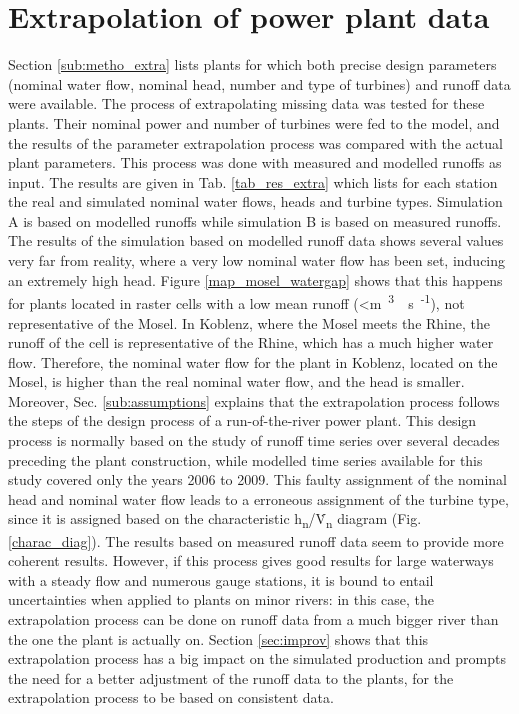 \section{Extrapolation of power plant data}
\label{sec:missing_data}
Section \ref{sub:metho_extra} lists plants for which both precise design parameters (nominal water flow, nominal head, number and type of turbines) and runoff data were available. The process of extrapolating missing data was tested for these plants. Their nominal power and number of turbines were fed to the model, and the results of the parameter extrapolation process was compared with the actual plant parameters. This process was done with measured and modelled runoffs as input. The results are given in Tab. \ref{tab_res_extra} which lists for each station the real and simulated nominal water flows, heads and turbine types. Simulation A is based on modelled runoffs while simulation B is based on measured runoffs. \newline
The results of the simulation based on modelled runoff data shows several values very far from reality, where a very low nominal water flow has been set, inducing an extremely high head. Figure \ref{map_mosel_watergap} shows that this happens for plants located in raster cells with a low mean runoff (<\unit[10]{m\textsuperscript{3}\textperiodcentered s\textsuperscript{-1}}), not representative of the Mosel. In Koblenz, where the Mosel meets the Rhine, the runoff of the cell is representative of the Rhine, which has a much higher water flow. Therefore, the nominal water flow for the plant in Koblenz, located on the Mosel, is higher than the real nominal water flow, and the head is smaller. Moreover, Sec. \ref{sub:assumptions} explains that the extrapolation process follows the steps of the design process of a run-of-the-river power plant. This design process is normally based on the study of runoff time series over several decades preceding the plant construction, while modelled time series available for this study covered only the years 2006 to 2009. \newline
This faulty assignment of the nominal head and nominal water flow leads to a erroneous assignment of the turbine type, since it is assigned based on the characteristic h\textsubscript{n}/\.V\textsubscript{n} diagram (Fig. \ref{charac_diag}). \newline
The results based on measured runoff data seem to provide more coherent results. However, if this process gives good results for large waterways with a steady flow and numerous gauge stations, it is bound to entail uncertainties when applied to plants on minor rivers: in this case, the extrapolation process can be done on runoff data from a much bigger river than the one the plant is actually on.\newline
Section \ref{sec:improv} shows that this extrapolation process has a big impact on the simulated production and prompts the need for a better adjustment of the runoff data to the plants, for the extrapolation process to be based on consistent data.



